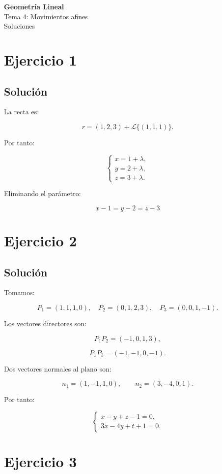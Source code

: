 \documentclass[11pt,a4paper]{article}
\begin{document}
\begin{center}
{\LARGE\bfseries Geometría Lineal}\\[0.4em]
{\Large Tema 4: Movimientos afines}\\[0.4em]
{\large Soluciones}
\end{center}

\section{Ejercicio 1}
\subsection{Solución}

La recta es:

\[
r=(1,2,3)+\mathcal L\{(1,1,1)\}.
\]

Por tanto:

\[
\boxed{
\begin{cases}
x=1+\lambda,\\
y=2+\lambda,\\
z=3+\lambda.
\end{cases}
}
\]

Eliminando el parámetro:

\[
\boxed{
x-1=y-2=z-3
}
\]

\section{Ejercicio 2}
\subsection{Solución}

Tomamos:

\[
P_1=(1,1,1,0),
\quad
P_2=(0,1,2,3),
\quad
P_3=(0,0,1,-1).
\]

Los vectores directores son:

\[
P_1P_2=(-1,0,1,3),
\]

\[
P_1P_3=(-1,-1,0,-1).
\]

Dos vectores normales al plano son:

\[
n_1=(1,-1,1,0),
\qquad
n_2=(3,-4,0,1).
\]

Por tanto:

\[
\boxed{
\begin{cases}
x-y+z-1=0,\\
3x-4y+t+1=0.
\end{cases}
}
\]

\section{Ejercicio 3}
\end{document}
